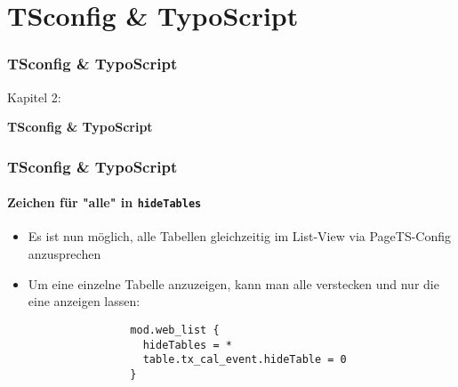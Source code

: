 %

\section{TSconfig \& TypoScript}
\begin{frame}[fragile]
	\frametitle{TSconfig \& TypoScript}

	\begin{center}\huge{Kapitel 2:}\end{center}
	\begin{center}\huge{\color{typo3darkgrey}\textbf{TSconfig \& TypoScript}}\end{center}

\end{frame}

\begin{frame}[fragile]
	\frametitle{TSconfig \& TypoScript}
	\framesubtitle{Zeichen für "alle" in \texttt{hideTables}}

	\lstset{basicstyle=\tiny\ttfamily}

	\begin{itemize}
		\item Es ist nun möglich, alle Tabellen gleichzeitig im List-View via PageTS-Config anzusprechen

		\item Um eine einzelne Tabelle anzuzeigen, kann man alle verstecken und nur die eine anzeigen lassen:

			\begin{lstlisting}
				mod.web_list {
				  hideTables = *
				  table.tx_cal_event.hideTable = 0
				}
			\end{lstlisting}

	\end{itemize}

\end{frame}

